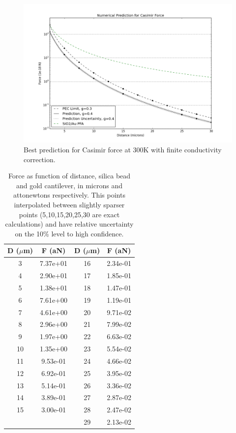 \documentclass[11pt]{article}
\begin{document}
\begin{figure}[h]
\centering
\includegraphics[width=7in]{prediction}
\caption{Best prediction for Casimir force at 300K with finite conductivity correction.}\label{fig:prediction}
\end{figure}

\begin{table}[h]
\centering
\begin{tabular}{c | c || c | c}
D ($\mu$m) & F (aN) &D ($\mu$m) & F (aN) \\
\hline
   3 & 7.37e+01 &  16 & 2.34e-01 \\
   4 & 2.90e+01 & 17 & 1.85e-01 \\
   5 & 1.38e+01 &  18 & 1.47e-01 \\
   6 & 7.61e+00 &  19 & 1.19e-01 \\
   7 & 4.61e+00 & 20 & 9.71e-02 \\
   8 & 2.96e+00 &  21 & 7.99e-02 \\
   9 & 1.97e+00 &  22 & 6.63e-02 \\
  10 & 1.35e+00 &  23 & 5.54e-02 \\
  11 & 9.53e-01 & 24 & 4.66e-02 \\
  12 & 6.92e-01 &  25 & 3.95e-02 \\
  13 & 5.14e-01 &  26 & 3.36e-02 \\
  14 & 3.89e-01 & 27 & 2.87e-02 \\
  15 & 3.00e-01 & 28 & 2.47e-02 \\
   & & 29 & 2.13e-02 \\
   \hline
\end{tabular}
\caption{Force as function of distance, silica bead and gold cantilever, in microns and attonewtons respectively. This points interpolated between slightly sparser points (5,10,15,20,25,30 are exact calculations) and have relative uncertainty on the 10\% level to high confidence.}
\end{table}
\end{document}
